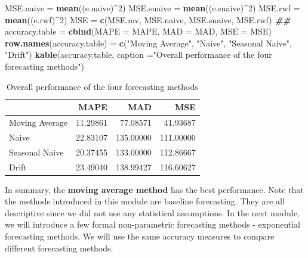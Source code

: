 \documentclass[
]{book}
\newenvironment{Shaded}{\begin{snugshade}}{\end{snugshade}}
\newcommand{\AttributeTok}[1]{\textcolor[rgb]{0.13,0.29,0.53}{#1}}
\newcommand{\DecValTok}[1]{\textcolor[rgb]{0.00,0.00,0.81}{#1}}
\newcommand{\DocumentationTok}[1]{\textcolor[rgb]{0.56,0.35,0.01}{\textbf{\textit{#1}}}}
\newcommand{\FunctionTok}[1]{\textcolor[rgb]{0.13,0.29,0.53}{\textbf{#1}}}
\newcommand{\NormalTok}[1]{#1}
\newcommand{\OtherTok}[1]{\textcolor[rgb]{0.56,0.35,0.01}{#1}}
\newcommand{\SpecialCharTok}[1]{\textcolor[rgb]{0.81,0.36,0.00}{\textbf{#1}}}
\newcommand{\StringTok}[1]{\textcolor[rgb]{0.31,0.60,0.02}{#1}}
\begin{document}
\begin{Shaded}
\begin{Highlighting}[]
\NormalTok{MSE.naive }\OtherTok{=} \FunctionTok{mean}\NormalTok{((e.naive)}\SpecialCharTok{\^{}}\DecValTok{2}\NormalTok{)}
\NormalTok{MSE.snaive }\OtherTok{=} \FunctionTok{mean}\NormalTok{((e.snaive)}\SpecialCharTok{\^{}}\DecValTok{2}\NormalTok{)}
\NormalTok{MSE.rwf }\OtherTok{=} \FunctionTok{mean}\NormalTok{((e.rwf)}\SpecialCharTok{\^{}}\DecValTok{2}\NormalTok{)}
\NormalTok{MSE }\OtherTok{=} \FunctionTok{c}\NormalTok{(MSE.mv, MSE.naive, MSE.snaive, MSE.rwf)}
\DocumentationTok{\#\#}
\NormalTok{accuracy.table }\OtherTok{=} \FunctionTok{cbind}\NormalTok{(}\AttributeTok{MAPE =}\NormalTok{ MAPE, }\AttributeTok{MAD =}\NormalTok{ MAD, }\AttributeTok{MSE =}\NormalTok{ MSE)}
\FunctionTok{row.names}\NormalTok{(accuracy.table) }\OtherTok{=} \FunctionTok{c}\NormalTok{(}\StringTok{"Moving Average"}\NormalTok{, }\StringTok{"Naive"}\NormalTok{, }\StringTok{"Seasonal Naive"}\NormalTok{, }\StringTok{"Drift"}\NormalTok{)}
\FunctionTok{kable}\NormalTok{(accuracy.table, }\AttributeTok{caption =}\StringTok{"Overall performance of the four forecasting methods"}\NormalTok{)}
\end{Highlighting}
\end{Shaded}

\begin{table}

\caption{\label{tab:unnamed-chunk-195}Overall performance of the four forecasting methods}
\centering
\begin{tabular}[t]{l|r|r|r}
\hline
  & MAPE & MAD & MSE\\
\hline
Moving Average & 11.29861 & 77.08571 & 41.93687\\
\hline
Naive & 22.83107 & 135.00000 & 111.00000\\
\hline
Seasonal Naive & 20.37455 & 133.00000 & 112.86667\\
\hline
Drift & 23.49040 & 138.99427 & 116.60627\\
\hline
\end{tabular}
\end{table}

In summary, the \textbf{moving average method} has the best performance. Note that the methods introduced in this module are baseline forecasting. They are all descriptive since we did not use any statistical assumptions. In the next module, we will introduce a few formal non-parametric forecasting methods - exponential forecasting methods. We will use the same accuracy measures to compare different forecasting methods.

\hfill\break
\end{document}
